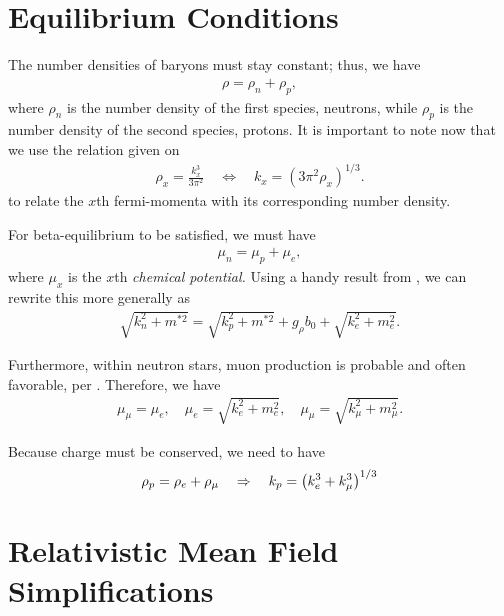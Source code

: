 \section{Equilibrium Conditions}

The number densities of baryons must stay constant; thus, we have
\begin{align}
    \rho = \rho_n + \rho_p,
\end{align}
where $\rho_n$ is the number density of the first species, neutrons, while $\rho_p$ is the number density of the second species, protons. It is important to note now that we use the relation given on \autocite[p. 90]{diener_2008}
\begin{align*}
    \rho_x = \frac{k_x^3}{3\pi^2} \quad\Longleftrightarrow\quad k_x = (3\pi^2\rho_x)^{1/3}.
\end{align*}
to relate the $x$th fermi-momenta with its corresponding number density.

For beta-equilibrium to be satisfied, we must have
\begin{align}
    \mu_n = \mu_p + \mu_e,
\end{align}
where $\mu_x$ is the $x$th \textit{chemical potential.} Using a handy result from \autocite[p. 90]{diener_2008}, we can rewrite this more generally as
\begin{align}
    \sqrt{k_n^2 + m^{*2}} = \sqrt{k_p^2 + m^{*2}} + g_\rho b_0 + \sqrt{k_e^2 + m_e^2}.
\end{align}

Furthermore, within neutron stars, muon production is probable and often favorable, per \autocite[p. 90]{diener_2008}. Therefore, we have
\begin{align}
    \mu_\mu = \mu_e,\quad \mu_e  = \sqrt{k_e^2 + m_e^2}, \quad \mu_\mu  = \sqrt{k_\mu^2 + m_\mu^2}.
\end{align}

Because charge must be conserved, we need to have
\begin{align}
    \rho_p = \rho_e + \rho_\mu \goesto k_p = \pqty{k_e^3 + k_\mu^3}^{1/3}
\end{align}

\section{Relativistic Mean Field Simplifications}


